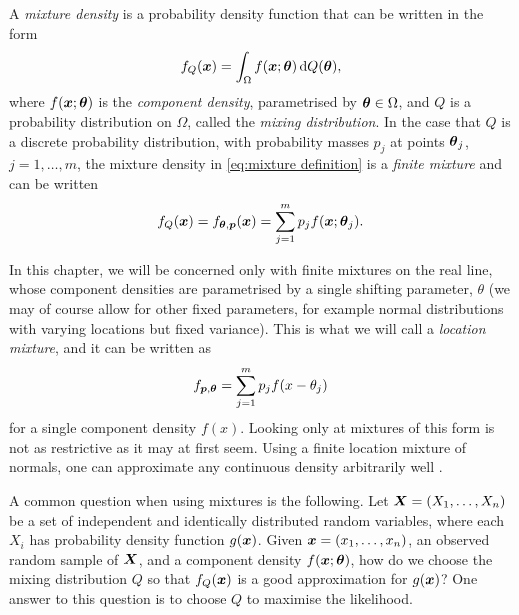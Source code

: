 
	A \emph{mixture density} is a probability density function that can be written in the form
	\begin{equation}
		f_Q({\bm{{x}}}) = \int_\Omega f({\bm{{x}}}; {\bm{{\theta}}}) \, \mathrm{d} Q({\bm{{\theta}}}),
		\label{eq:mixture definition}
	\end{equation}
	where $f({\bm{{x}}};{\bm{{\theta}}})$ is the \emph{component density}, parametrised by ${\bm{{\theta}}} \in \Omega$, and $Q$ is a probability distribution on $\Omega$, called the \emph{mixing distribution}. In the case that $Q$ is a discrete probability distribution, with probability masses $p_j$ at points ${\bm{{\theta}}}_j$, $j = 1, \dots, m$, the mixture density in \eqref{eq:mixture definition} is a \emph{finite mixture} and can be written
	\begin{equation}
		f_Q({\bm{{x}}}) = f_{{\bm{{\theta}}}, {\bm{{p}}}}({\bm{{x}}}) = \sum_{j = 1}^m p_j f({\bm{{x}}}; {\bm{{\theta}}}_j).
	\end{equation}

	In this chapter, we will be concerned only with finite mixtures on the real line, whose component densities are parametrised by a single shifting parameter, $\theta$ (we may of course allow for other fixed parameters, for example normal distributions with varying locations but fixed variance). This is what we will call a \emph{location mixture}, and it can be written as
	\begin{equation}
		f_{{\bm{{p}}}, {\bm{{\theta}}}} = \sum_{j = 1}^m p_j f(x - \theta_j)
		\label{eq:location mixture}
	\end{equation}
	for a single component density $f(x)$.
	Looking only at mixtures of this form is not as restrictive as it may at first seem. Using a finite location mixture of normals, one can approximate any continuous density arbitrarily well \cite{Nguyen2018-qx}.

	A common question when using mixtures is the following. Let ${\bm{{X}}} = (X_1, \dots, X_n)$ be a set of independent and identically distributed random variables, where each $X_i$ has probability density function $g({\bm{{x}}})$. Given ${\bm{{x}}} = (x_1, \dots, x_n)$, an observed random sample of ${\bm{{X}}}$, and a component density $f({\bm{{x}}}; {\bm{{\theta}}})$, how do we choose the mixing distribution $Q$ so that $f_Q({\bm{{x}}})$ is a good approximation for $g({\bm{{x}}})$?	One answer to this question is to choose $Q$ to maximise the likelihood.

